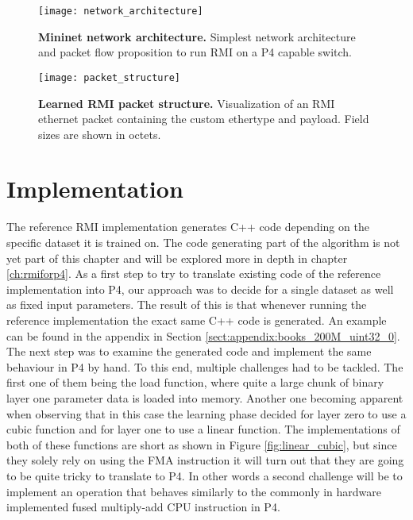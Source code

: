 \begin{figure}[!ht]
  \centering
  \texttt{[image: network\_architecture]}
  \caption[Mininet Network Architecture]{
    \textbf{Mininet network architecture.} Simplest network architecture and packet flow proposition to run RMI on a P4 capable switch.
  }
  \label{fig:network_architecture}
\end{figure}

\begin{figure}[!ht]
  \centering
  \texttt{[image: packet\_structure]}
  \caption[RMI Packet Structure]{
    \textbf{Learned RMI packet structure.} Visualization of an RMI ethernet packet containing the custom ethertype and payload. Field sizes are shown in octets.
  }
  \label{fig:packet_structure}
\end{figure}

\section{Implementation}
\label{sect:rmionbmv2:implmentation}
The reference RMI implementation \cite{cdfshop} generates C++ code depending on the specific dataset it is trained on. The code generating part of the algorithm is not yet part of this chapter and will be explored more in depth in chapter \ref{ch:rmiforp4}. As a first step to try to translate existing code of the reference implementation into P4, our approach was to decide for a single dataset as well as fixed input parameters. The result of this is that whenever running the reference implementation the exact same C++ code is generated. An example can be found in the appendix in Section \ref{sect:appendix:books_200M_uint32_0}. The next step was to examine the generated code and implement the same behaviour in P4 by hand. To this end, multiple challenges had to be tackled. The first one of them being the load function, where quite a large chunk of binary layer one parameter data is loaded into memory. Another one becoming apparent when observing that in this case the learning phase decided for layer zero to use a cubic function and for layer one to use a linear function. The implementations of both of these functions are short as shown in Figure \ref{fig:linear_cubic}, but since they solely rely on using the FMA instruction it will turn out that they are going to be quite tricky to translate to P4. In other words a second challenge will be to implement an operation that behaves similarly to the commonly in hardware implemented fused multiply-add CPU instruction in P4.

